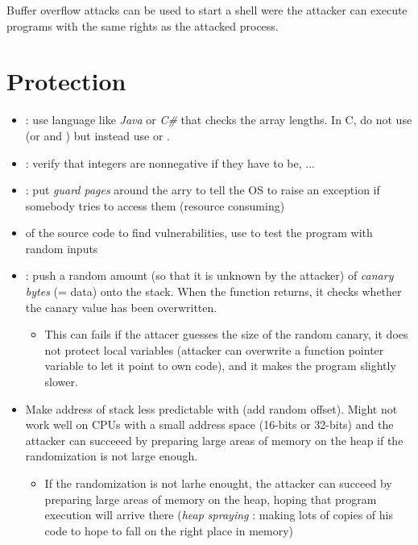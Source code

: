 Buffer overflow attacks can be used to start a shell were the attacker can execute programs with the same rights as the attacked process.

\section{Protection}

\begin{itemize}
    \item {} : use language like \textit{Java} or \textit{C\#} that checks the array lengths. In C, do not use  (or  and ) but instead use  or .
    \item {} : verify that integers are nonnegative if they have to be, ...
    \item {} : put \textit{guard pages} around the arry to tell the OS to raise an exception if somebody tries to access them (resource consuming)
    \item {} of the source code to find vulnerabilities, use  to test the program with random inputs
    \item {} : push a random amount (so that it is unknown by the attacker) of \textit{canary bytes} (= data) onto the stack. When the function returns, it checks whether the canary value has been overwritten.
        \begin{itemize}
            \item This can fails if the attacer guesses the size of the random canary, it does not protect local variables (attacker can overwrite a function pointer variable to let it point to own code), and it makes the program slightly slower.
        \end{itemize}
    \item Make address of stack less predictable with  (add random offset). Might not work well on CPUs with a small address space (16-bits or 32-bits) and the attacker can succeeed by preparing large areas of memory on the heap if the randomization is not large enough.
        \begin{itemize}
            \item If the randomization is not larhe enought, the attacker can succeed by preparing large areas of memory on the heap, hoping that program execution will arrive there (\textit{heap spraying} : making lots of copies of his code to hope to fall on the right place in memory)

\end{itemize}
\end{itemize}
